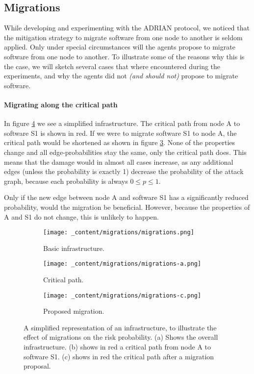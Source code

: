 \subsection{Migrations} 
\label{ssec:migrations}
While developing and experimenting with the ADRIAN protocol, we noticed that the mitigation strategy to migrate software from one node to another is seldom applied. Only under special circumstances will the agents propose to migrate software from one node to another. To illustrate some of the reasons why this is the case, we will sketch several cases that where encountered during the experiments, and why the agents did not \emph{(and should not)} propose to migrate software.

\paragraph*{Migrating along the critical path}
In figure \ref{fig:migrations-example} we see a simplified infrastructure. The critical path from node A to software S1 is shown in red. If we were to migrate software S1 to node A, the critical path would be shortened as shown in figure \ref{fig:migrations-shortened}. None of the properties change and all edge-probabilities stay the same, only the critical path does. This means that the damage would in almost all cases increase, as any additional edges (unless the probability is exactly 1) decrease the probability of the attack graph, because each probability is always \(0 \leq p \leq 1\). 

Only if the new edge between node A and software S1 has a significantly reduced probability, would the migration be beneficial. However, because the properties of A and S1 do not change, this is unlikely to happen. 

\begin{figure}[H]
    \begin{subfigure}[b]{0.3\textwidth}
        \centering
        \texttt{[image: \_content/migrations/migrations.png]}
        \caption{Basic infrastructure.}
        \label{fig:migrations-infrastructure}
    \end{subfigure}
    \begin{subfigure}[b]{0.3\textwidth}
        \centering
        \texttt{[image: \_content/migrations/migrations-a.png]}
        \caption{Critical path.}
        \label{fig:migrations-basic}
    \end{subfigure}
    \begin{subfigure}[b]{0.3\textwidth}
        \centering
        \texttt{[image: \_content/migrations/migrations-c.png]}
        \caption{Proposed migration.}
        \label{fig:migrations-shortened}
    \end{subfigure}
    \caption{A simplified representation of an infrastructure, to illustrate the effect of migrations on the risk probability. (a) Shows the overall infrastructure. (b) shows in red a critical path from node A to software S1. (c) shows in red the critical path after a migration proposal.}
    \label{fig:migrations-example}
\end{figure}

